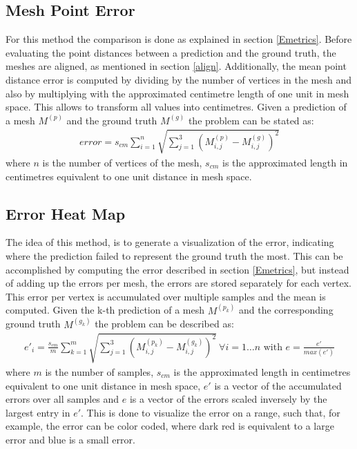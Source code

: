 \subsection{Mesh Point Error} %
\label{mpError}
For this method the comparison is done as explained in section \ref{Emetrics}. Before evaluating the point distances between a prediction and the ground truth, the meshes are aligned, as mentioned in section \ref{align}. Additionally, the mean point distance error is computed by dividing by the number of vertices in the mesh and also by multiplying with the approximated centimetre length of one unit in mesh space. This allows to transform all values into centimetres. Given a prediction of a mesh $M^{(p)}$ and the ground truth $M^{(g)}$ the problem can be stated as:
\begin{gather}
error = s_{cm}\sum_{i=1}^{n} \sqrt{\sum_{j=1}^3(M_{i,j}^{(p)} - M_{i,j}^{(g)})^2}
\end{gather}
where $n$ is the number of vertices of the mesh, $s_{cm}$ is the approximated length in centimetres equivalent to one unit distance in mesh space.
\subsection{Error Heat Map} %
\label{mhError}
The idea of this method, is to generate a visualization of the error, indicating where the prediction failed to represent the ground truth the most. This can be accomplished by computing the error described in section \ref{Emetrics}, but instead of adding up the errors per mesh, the errors are stored separately for each vertex. This error per vertex is accumulated over multiple samples and the mean is computed. Given the k-th prediction of a mesh $M^{(p_k)}$ and the corresponding ground truth $M^{(g_k)}$ the problem can be described as:
\begin{gather}
e'_{i} = \frac{s_{cm}}{m} \sum_{k=1}^{m} \sqrt{\sum_{j=1}^3(M_{i,j}^{(p_k)} - M_{i,j}^{(g_k)})^2} \  \forall i=1 \dots n \text{ with } e = \frac{e'}{max(e')}
\end{gather}
where $m$ is the number of samples, $s_{cm}$ is the approximated length in centimetres equivalent to one unit distance in mesh space, $e'$ is a vector of the accumulated errors over all samples and $e$ is a vector of the errors scaled inversely by the largest entry in $e'$. This is done to visualize the error on a range, such that, for example, the error can be color coded, where dark red is equivalent to a large error and blue is a small error.

